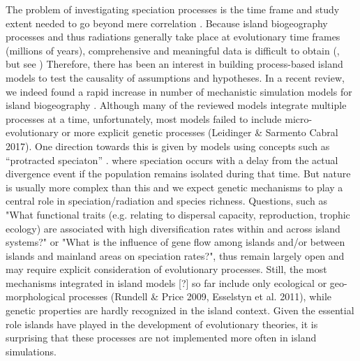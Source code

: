\documentclass[a4paper]{scrartcl}
\begin{document}
The problem of investigating speciation processes is the time frame and study extent needed to go beyond mere correlation \cite{dormannCorrelationProcessSpecies}.
Because island biogeography processes and thus radiations generally take place at evolutionary time frames (millions of years),
comprehensive and meaningful data is difficult to obtain (\cite{didierLikelihoodTreeTopologies2017}, but see \cite{mitchellInferringDiversificationRate})
Therefore, there has been an interest in building process-based island models to test the causality of assumptions and hypotheses.
In a recent review, we indeed found a rapid increase in number of mechanistic simulation models for island biogeography \cite{leidingerBiodiversityDynamicsIslands2017}.
Although many of the reviewed models integrate multiple processes at a time, unfortunately,
most models failed to include micro-evolutionary or more explicit genetic processes %
(Leidinger \& Sarmento Cabral 2017).
One direction towards this is given by models using concepts such as ``protracted speciaton'' \cite{rosindellUnifiedModelSpecies2013}.
where speciation occurs with a delay from the actual
divergence event if the population remains isolated during that time.
But nature is usually more complex than this %
and we expect genetic mechanisms to play a central role in speciation/radiation and species richness.
Questions, such as "What functional traits (e.g. relating to dispersal capacity,
reproduction, trophic ecology) are associated with high diversification rates within and across island systems?" %
or "What is the influence of gene flow among islands and/or
between islands and mainland areas on speciation rates?", thus remain largely open \cite{patinoRoadmapIslandBiology2017}
and may require explicit consideration of evolutionary processes.
Still, the most mechanisms integrated in island models [?] so far include only ecological
or geo-morphological processes (Rundell \& Price 2009, Esselstyn et al. 2011),
while genetic properties are hardly recognized in the island context.
Given the essential role islands have played in the development of evolutionary theories, it is surprising that these processes
are not implemented more often in island simulations.
\end{document}
